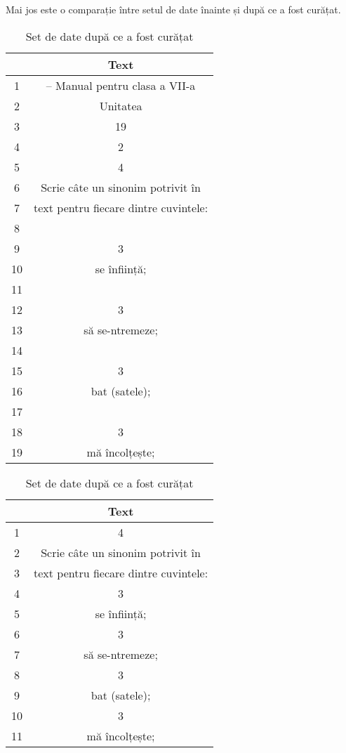 Mai jos este o comparație între setul de date înainte și după ce a fost curățat.
\begin{table}[H]
	\centering
	\begin{minipage}{0.45\textwidth}
		\centering
		\begin{tabular}{|c|c|}
			\hline
			 & Text \\
			\hline
			1 & – Manual pentru clasa a VII-a \\
			\hline
			2 & Unitatea \\
			\hline
			3 & 19 \\
			\hline
			4 & 2 \\
			\hline
			5 & 4 \\
			\hline
			6 & Scrie câte un sinonim potrivit în \\
			\hline
			7 & text pentru fiecare dintre cuvintele: \\
			\hline
			8 &  \\
			\hline
			9 & 3 \\
			\hline
			10 & se înființă; \\
			\hline
			11 &  \\
			\hline
			12 & 3 \\
			\hline
			13 & să se-ntremeze; \\
			\hline
			14 &  \\
			\hline
			15 & 3 \\
			\hline
			16 & bat (satele); \\
			\hline
			17 &  \\
			\hline
			18 & 3 \\
			\hline
			19 & mă încolțește; \\
			\hline
		\end{tabular}
		\caption{Set de date înainte să fie curățat}
	\end{minipage}
	\hfill
	\begin{minipage}{0.45\textwidth}
		\centering
		\begin{tabular}{|c|c|}
			\hline
			& Text \\
			\hline
			1 & 4 \\
			\hline
			2 & Scrie câte un sinonim potrivit în \\
			\hline
			3 & text pentru fiecare dintre cuvintele: \\
			\hline
			4 & 3 \\
			\hline
			5 & se înființă; \\
			\hline
			6 & 3 \\
			\hline
			7 & să se-ntremeze; \\
			\hline
			8 & 3 \\
			\hline
			9 & bat (satele); \\
			\hline
			10 & 3 \\
			\hline
			11 & mă încolțește; \\
			\hline
		\end{tabular}
		\caption{Set de date după ce a fost curățat}
	\end{minipage}
\end{table}


